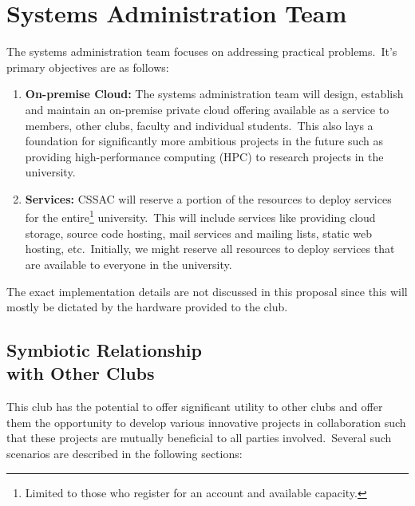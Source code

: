 



\section{\large Systems Administration Team}\label{sec:systems-administration-team}
The systems administration team focuses on addressing practical problems.\ It's primary objectives are as follows:
\begin{enumerate}
    \item \textbf{On-premise Cloud:} The systems administration team will design, establish and maintain an
    on-premise private cloud offering available as a service to members, other clubs, faculty and individual
    students.\ This also lays a foundation for significantly more ambitious projects in the future such as providing
    high-performance computing (HPC) to research projects in the university.
    \item \textbf{Services:} CSSAC will reserve a portion of the resources to deploy services for the
    entire\footnote{Limited to those who register for an account and available capacity.} university.\ This will
    include services like providing cloud storage, source code hosting, mail services and mailing lists, static web
    hosting, etc.\ Initially, we might reserve all resources to deploy services that are available to everyone in
    the university.
\end{enumerate}
The exact implementation details are not discussed in this proposal since this will mostly be dictated by the
hardware provided to the club.


\subsection[Symbiotic Relationship with Other Clubs]{Symbiotic Relationship \\ with Other Clubs}
\label{subsec:symbiotic-relationship-with-other-clubs}
This club has the potential to offer significant utility to other clubs and offer them the opportunity to develop
various innovative projects in collaboration such that these projects are mutually beneficial to all parties
involved.\ Several such scenarios are described in the following sections:

